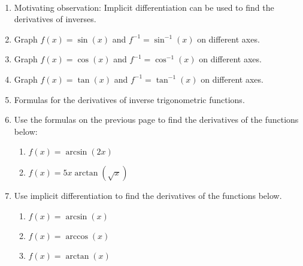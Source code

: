 \documentclass[11pt,fleqn]{article}
\begin{document}
\renewcommand{\headrulewidth}{0pt}
\newcommand{\blank}[1]{\rule{#1}{0.75pt}}
\newcommand{\bc}{\begin{center}}
\newcommand{\ec}{\end{center}}
\renewcommand{\d}{\displaystyle}

\vspace*{-0.7in}

\begin{center}
  \large
  \\
\end{center}
\begin{enumerate}
\item Motivating observation: Implicit differentiation can be used to find the derivatives of inverses.\\
\item Graph $f(x)=\sin (x)$ and $f^{-1}= \sin^{-1} (x)$ on different axes.
\vfill
\item Graph $f(x)=\cos (x)$ and $f^{-1}= \cos^{-1} (x)$ on different axes.
\vfill
\item Graph $f(x)=\tan (x)$ and $f^{-1}= \tan^{-1} (x)$ on different axes.
\vfill


\item Formulas for the derivatives of inverse trigonometric functions.\\
\vfill
\newpage
\item Use the formulas on the previous page to find the derivatives of the functions below:
	\begin{enumerate}
	\item $f(x)=\arcsin(2x)$
	\vfill
	\item $f(x)=5x\arctan(\sqrt{x})$
	\vfill
	\end{enumerate}
\item Use implicit differentiation to find the derivatives of the functions below.
	\begin{enumerate}
	\item $f(x)=\arcsin(x)$
	\vfill
	\item $f(x)=\arccos(x)$
	\vfill
	\item $f(x)=\arctan(x)$
	\vfill
	\end{enumerate}
\end{enumerate}
\end{document}
